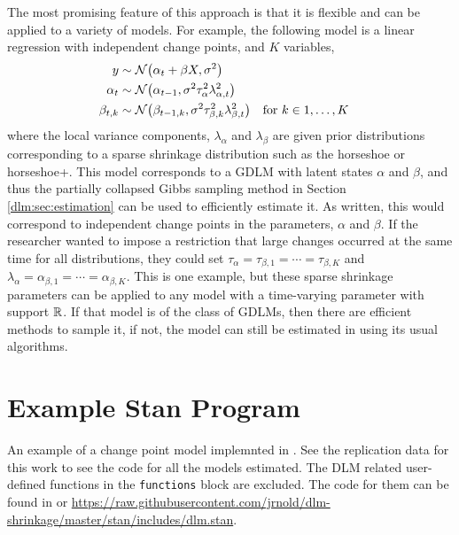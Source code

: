 The most promising feature of this approach is that it is flexible and can be applied to a variety of models.
For example, the following model is a linear regression with independent change points, and $K$ variables,
\begin{equation}
  \label{dlm:eq:32}
  \begin{aligned}[t]
  y & \sim \mathcal{N}\mathopen{}\left(\alpha_{t} + \beta X, \sigma^{2}\right)\mathclose{} \\
  \alpha_{t} & \sim \mathcal{N}\mathopen{}\left(\alpha_{t-1}, \sigma^{2} \tau_{\alpha}^{2} \lambda_{\alpha,t}^{2}\right)\mathclose{} \\
  \beta_{t,k} & \sim \mathcal{N}\mathopen{}\left(\beta_{t-1,k}, \sigma^{2} \tau_{\beta, k}^{2} \lambda_{\beta,t}^{2}\right)\mathclose{} &&\text{for $k \in 1, \dots, K$}
  \end{aligned}
\end{equation}
where the local variance components, $\lambda_{\alpha}$ and $\lambda_{\beta}$ are given prior distributions corresponding to a sparse shrinkage distribution such as the horseshoe or horseshoe+.
This model corresponds to a GDLM with latent states $\alpha$ and $\beta$, and thus the partially collapsed Gibbs sampling method in Section \ref{dlm:sec:estimation} can be used to efficiently estimate it.
As written, this would correspond to independent change points in the parameters, $\alpha$ and $\beta$. 
If the researcher wanted to impose a restriction that large changes occurred at the same time for all distributions, they could set $\tau_{\alpha} = \tau_{\beta,1} = \cdots = \tau_{\beta, K}$ and $\lambda_{\alpha} = \alpha_{\beta,1} = \cdots = \alpha_{\beta, K}$.
This is one example, but these sparse shrinkage parameters can be applied to any model with a time-varying parameter with support $\mathbb{R}$.
If that model is of the class of GDLMs, then there are efficient methods to sample it, if not, the model can still be estimated in \Stan{} using its usual algorithms.

\setcounter{section}{0}
\let\oldthesection\thesection
\renewcommand{\thesection}{\thechapter.\Alph{section}}
\section{Example Stan Program}
\label{dlm:sec:example-stan-program}

An example of a change point model implemnted in \Stan{}.
See the replication data for this work to see the code for all the \Stan{} models estimated.
The DLM related user-defined functions in the \texttt{functions} block are excluded.
The code for them can be found in \textcite{Arnold2015c} or \url{https://raw.githubusercontent.com/jrnold/dlm-shrinkage/master/stan/includes/dlm.stan}.


